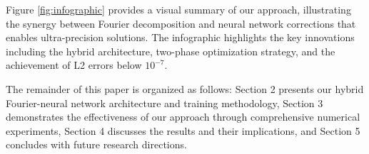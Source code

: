 Figure \ref{fig:infographic} provides a visual summary of our approach, illustrating the synergy between Fourier decomposition and neural network corrections that enables ultra-precision solutions. The infographic highlights the key innovations including the hybrid architecture, two-phase optimization strategy, and the achievement of L2 errors below $10^{-7}$.

The remainder of this paper is organized as follows: Section 2 presents our hybrid Fourier-neural network architecture and training methodology, Section 3 demonstrates the effectiveness of our approach through comprehensive numerical experiments, Section 4 discusses the results and their implications, and Section 5 concludes with future research directions.